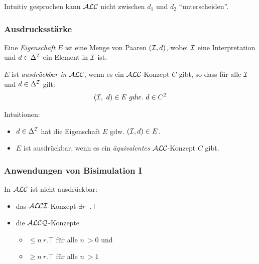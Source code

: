 Intuitiv gesprochen kann $\mathcal{A}\mathcal{L}\mathcal{C}$ nicht zwischen $d_1$ und $d_2$ \enquote{unterscheiden}.

\subsubsection{Ausdrucksstärke}\label{ausdrucksstuxe4rke}

\begin{definition}

Eine \emph{Eigenschaft} $E$ ist eine Menge von Paaren $(\mathcal{I},d)$, wobei
$\mathcal{I}$ eine Interpretation und $d \in \Delta^{\mathcal{I}}$ ein Element in $\mathcal{I}$ ist.

$E$ ist \emph{ausdrückbar in $\mathcal{A}\mathcal{L}\mathcal{C}$}, wenn es ein $\mathcal{A}\mathcal{L}\mathcal{C}$-Konzept $C$
gibt, so dass für alle $\mathcal{I}$ und $d \in \Delta^{\mathcal{I}}$ gilt: \begin{align*}
\left( \mathcal{I},\ d \right) \in E\ gdw.\ d \in C^{\mathcal{I}}
\end{align*}
\end{definition}

Intuitionen:
\begin{itemize}
    \item $d \in \Delta^{\mathcal{I}}$ hat die Eigenschaft $E$ gdw. $(\mathcal{I}, d) \in E$.
    \item $E$ ist ausdrückbar, wenn es ein \emph{äquivalentes} $\mathcal{A}\mathcal{L}\mathcal{C}$-Konzept $C$ gibt.
\end{itemize}

\subsubsection{Anwendungen von Bisimulation I}\label{theorem-3.4}

\begin{theorem}
    \label{thm:beschraenkt}
In $\mathcal{A}\mathcal{L}\mathcal{C}$ ist nicht ausdrückbar: 
\begin{itemize}
\item das $\mathcal{A}\mathcal{L}\mathcal{C}\mathcal{I}$-Konzept $\exists r^{-}.\top$ 
\item die $\mathcal{A}\mathcal{L}\mathcal{C}\mathcal{Q}$-Konzepte
\begin{itemize}
  \item $\leq n\ r.\top$ für alle $n\ > 0$ und
  \item $\geq n\ r.\top$ für alle $n\ > 1$
\end{itemize}
\end{itemize}
\end{theorem}



